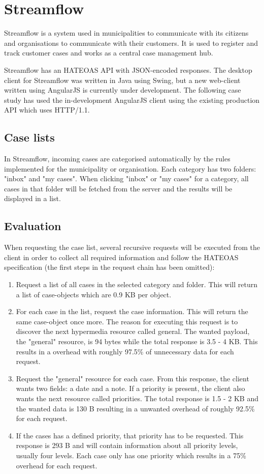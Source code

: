 \documentclass{cslthse-msc}
\begin{document}
\section{Streamflow}
Streamflow\cite{streamflow} is a system used in municipalities to communicate with its citizens and organisations to communicate with their customers. It is used to register and track customer cases and works as a central case management hub.

Streamflow has an HATEOAS API with JSON-encoded responses. The desktop client for Streamflow was written in Java using Swing, but a new web-client written using AngularJS is currently under development. The following case study has used the in-development AngularJS client using the existing production API which uses HTTP/1.1.

\subsection{Case lists}
In Streamflow, incoming cases are categorised automatically by the rules implemented for the municipality or organisation. Each category has two folders: "inbox" and "my cases". When clicking "inbox" or "my cases" for a category, all cases in that folder will be fetched from the server and the results will be displayed in a list.

\subsection{Evaluation}
When requesting the case list, several recursive requests will be executed from the client in order to collect all required information and follow the HATEOAS specification (the first steps in the request chain has been omitted):

\begin{enumerate}
	\item Request a list of all cases in the selected category and folder. This will return a list of case-objects which are 0.9 KB per object.
	\item For each case in the list, request the case information. This will return the same case-object once more. The reason for executing this request is to discover the next hypermedia resource called general. The wanted payload, the "general" resource, is 94 bytes while the total response is 3.5 - 4 KB. This results in a overhead with roughly 97.5\% of unnecessary data for each request.
	\item Request the "general" resource for each case. From this response, the client wants two fields: a date and a note. If a priority is present, the client also wants the next resource called priorities. The total response is 1.5 - 2 KB and the wanted data is 130 B resulting in a unwanted overhead of roughly 92.5\% for each request.
	\item If the cases has a defined priority, that priority has to be requested. This response is 293 B and will contain information about all priority levels, usually four levels. Each case only has one priority which results in a 75\% overhead for each request.
\end{enumerate}
\end{document}
